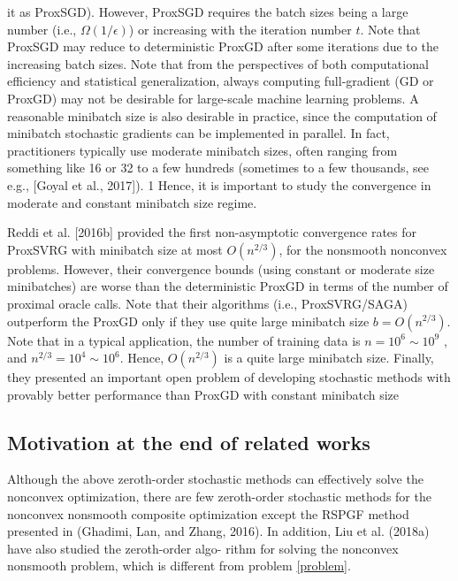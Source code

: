 \documentclass{article}
\theoremstyle{definition}
\theoremstyle{remark}
\begin{document}
{{it as ProxSGD). However, ProxSGD requires the batch sizes being a large number (i.e., $\Omega(1/\epsilon)$) or increasing with
the iteration number $t$. Note that ProxSGD may reduce to deterministic ProxGD after some iterations due to the
increasing batch sizes. Note that from the perspectives of both computational efficiency and statistical generalization,
always computing full-gradient (GD or ProxGD) may not be desirable for large-scale machine learning problems. A reasonable minibatch size is also desirable in practice, since the computation of minibatch stochastic gradients can be
implemented in parallel. In fact, practitioners typically use moderate minibatch sizes, often ranging from something
like 16 or 32 to a few hundreds (sometimes to a few thousands, see e.g., [Goyal et al., 2017]). 1 Hence, it is important
to study the convergence in moderate and constant minibatch size regime.

Reddi et al. [2016b] provided the first non-asymptotic convergence rates for ProxSVRG with minibatch size at most $O(n^{2/3})$, for the nonsmooth nonconvex problems. However, their convergence bounds (using constant or moderate
size minibatches) are worse than the deterministic ProxGD in terms of the number of proximal oracle calls. Note that their algorithms (i.e., ProxSVRG/SAGA) outperform the ProxGD only if they use quite large minibatch size
$b = O(n^{2/3})$. Note that in a typical application, the number of training data is $n = 10^6 \sim 10^9$ , and $n^{2/3} = 10^4 \sim 10^6$.
Hence, $O(n^{2/3})$ is a quite large minibatch size. Finally, they presented an important open problem of developing
stochastic methods with provably better performance than ProxGD with constant minibatch size
}
\subsection{Motivation at the end of related works}
Although the above zeroth-order stochastic methods can effectively solve the nonconvex optimization, there are few zeroth-order stochastic methods for the nonconvex nonsmooth composite optimization except the RSPGF method presented in (Ghadimi, Lan, and Zhang, 2016). In addition, Liu et al. (2018a) have also studied the zeroth-order algo-
rithm for solving the nonconvex nonsmooth problem, which is different from problem \eqref{problem}.
}
\end{document}
